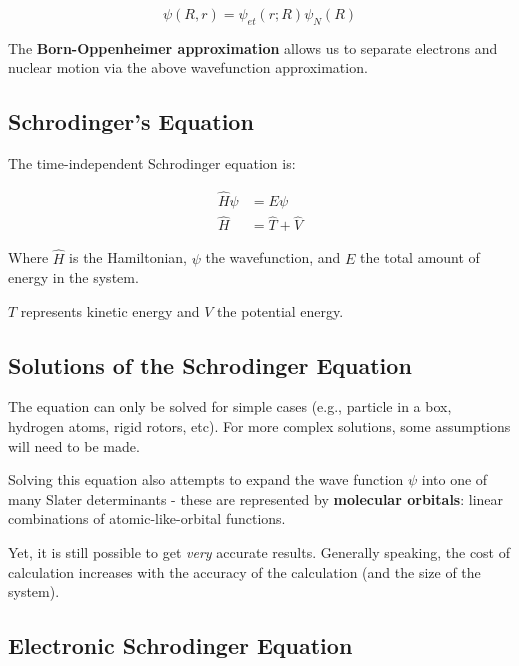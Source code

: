 \documentclass[
  letterpaper,
  DIV=11,
  numbers=noendperiod]{scrreprt}
\begin{document}
\begin{equation}
  \psi(R, r) = \psi_{et}(r; R)\psi_N(R)
\end{equation}

The \textbf{Born-Oppenheimer approximation} allows us to separate
electrons and nuclear motion via the above wavefunction approximation.

\hypertarget{schrodingers-equation}{%
\subsection{Schrodinger's Equation}\label{schrodingers-equation}}

The time-independent Schrodinger equation is:

\begin{align}
  \hat{H}\psi &= E\psi \\ 
  \hat{H} &= \hat{T} + \hat{V}
\end{align}

Where \(\hat{H}\) is the Hamiltonian, \(\psi\) the wavefunction, and
\(E\) the total amount of energy in the system.

\(T\) represents kinetic energy and \(V\) the potential energy.

\hypertarget{solutions-of-the-schrodinger-equation}{%
\subsection{Solutions of the Schrodinger
Equation}\label{solutions-of-the-schrodinger-equation}}

The equation can only be solved for simple cases (e.g., particle in a
box, hydrogen atoms, rigid rotors, etc). For more complex solutions,
some assumptions will need to be made.

Solving this equation also attempts to expand the wave function \(\psi\)
into one of many Slater determinants - these are represented by
\textbf{molecular orbitals}: linear combinations of atomic-like-orbital
functions.

Yet, it is still possible to get \emph{very} accurate results. Generally
speaking, the cost of calculation increases with the accuracy of the
calculation (and the size of the system).

\hypertarget{electronic-schrodinger-equation}{%
\subsection{Electronic Schrodinger
Equation}\label{electronic-schrodinger-equation}}
\end{document}
